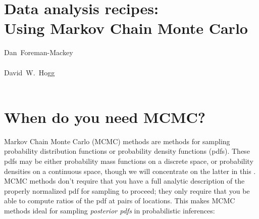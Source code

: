 \documentclass[12pt,twoside,pdftex]{article}
\newcommand{\this}{Using Markov Chain Monte Carlo}
\begin{document}
\thispagestyle{plain}\raggedbottom
\section*{Data analysis recipes:\\ \this\footnotemark}


\noindent
Dan~Foreman-Mackey\\
\\[1ex]
David~W.~Hogg\\
\\

\begin{abstract}
Markov Chain Monte Carlo (MCMC) methods for sampling probability
distribution functions, plus abundant computational resources,
have transformed the sciences.
Here we give a fast overview of basic MCMC methods and then turn to
practical advice for their use in real inference problems.
We give advice on method choice, tuning for performance,
initialization and burn-in, judging convergence, and use of the chain
output to produce parameter estimates with associated uncertainties.
[Insert some generally useful point here!]
\end{abstract}

\section{When do you need MCMC?}

Markov Chain Monte Carlo (MCMC) methods are methods for sampling
probability distribution functions or probability density functions (pdfs).
These pdfs may be either probability mass functions on a discrete
space, or probability densities on a continuous space, though we will
concentrate on the latter in this \documentname.
MCMC methods don't require that you have a full analytic description of the
properly normalized pdf for sampling to proceed; they only require
that you be able to compute ratios of the pdf at pairs of locations.
This makes MCMC methods ideal for sampling \emph{posterior
  pdfs} in probabilistic inferences:
\end{document}
